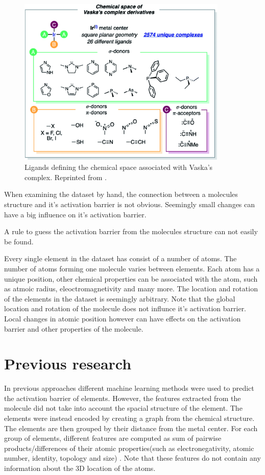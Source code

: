 \begin{figure}
  \centering
  \includegraphics[width=10cm]{figures/introduction/chem-space.png}
  \caption{Ligands defining the chemical space associated with Vaska's complex. Reprinted from \cite{friederich_dos}.}
  \label{fig:chemspace}
\end{figure}

When examining the dataset by hand, the connection between a molecules structure and it's activation barrier is not obvious.
Seemingly small changes can have a big influence on it's activation barrier.

A rule to guess the activation barrier from the molecules structure can not easily be found.

Every single element in the dataset has consist of a number of atoms.
The number of atoms forming one molecule varies between elements.
Each atom has a unique position, other chemical properties can be associated with the atom, such as atmoic radius, eleoctromagnetivity and many more.
The location and rotation of the elements in the dataset is seemingly arbitrary.
Note that the global location and rotation of the molecule does not influnce it's activation barrier.
Local changes in atomic position however can have effects on the activation barrier and other properties of the molecule.
  

\section{Previous research}

In previous approaches different machine learning methods were used to predict the activation barrier of elements.
However, the features extracted from the molecule did not take into account the spacial structure of the element.
The elements were instead encoded by creating a graph from the chemical structure.
The elements are then grouped by their distance from the metal center.
For each group of elements, different features are computed as sum of pairwise products/differences of their atomic properties(such as electronegativity, atomic number, identity, topology and size) \cite{friederich_dos}.
Note that these features do not contain any information about the 3D location of the atoms.

